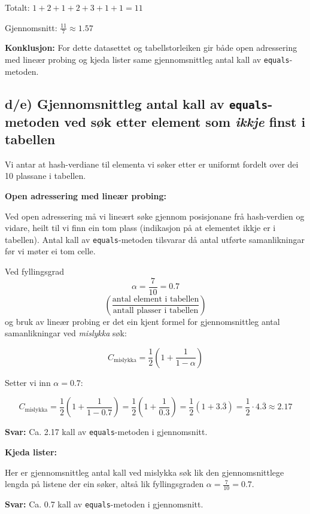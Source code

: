 \documentclass[12pt]{article}
\begin{document}
\noindent 
Totalt: $1 + 2 + 1 + 2 + 3 + 1 + 1 = 11$

\noindent
Gjennomsnitt: $\frac{11}{7} \approx 1.57$

\noindent
\textbf{Konklusjon:} For dette datasettet og tabellstorleiken gir både 
open adressering med lineær probing og kjeda lister same gjennomsnittleg 
antal kall av \texttt{equals}-metoden.

\subsection*{d/e) Gjennomsnittleg antal kall av \texttt{equals}-metoden ved søk etter element som \emph{ikkje} finst i tabellen}

\noindent 
Vi antar at hash-verdiane til elementa vi søker etter er uniformt fordelt 
over dei 10 plassane i tabellen.

\noindent 
\textbf{Open adressering med lineær probing:}

\noindent 
Ved open adressering må vi lineært søke gjennom posisjonane frå hash-verdien og vidare, 
heilt til vi finn ein tom plass (indikasjon på at elementet ikkje er i tabellen). 
Antal kall av \texttt{equals}-metoden tilsvarar då antal utførte samanlikningar før 
vi møter ei tom celle.

\noindent 
Ved fyllingsgrad 
\[
    \alpha = \frac{7}{10} = 0.7
\]
\[
    \left(\frac{\text{antal element i tabellen}}{\text{antall plasser i tabellen}}\right) 
\]
og bruk av lineær probing er det 
ein kjent formel for gjennomsnittleg antal samanlikningar ved \emph{mislykka} søk:

\[
C_{\text{mislykka}} = \frac{1}{2} \left( 1 + \frac{1}{1 - \alpha} \right)
\]

\noindent 
Setter vi inn $\alpha = 0.7$:

\[
C_{\text{mislykka}} = \frac{1}{2} \left( 1 + \frac{1}{1 - 0.7} \right) = 
\frac{1}{2} \left( 1 + \frac{1}{0.3} \right) = \frac{1}{2} (1 + 3.\overline{3}) = 
\frac{1}{2} \cdot 4.\overline{3} \approx 2.17
\]

\noindent 
\textbf{Svar:} Ca. 2.17 kall av \texttt{equals}-metoden i gjennomsnitt.

\noindent 
\textbf{Kjeda lister:}

\noindent 
Her er gjennomsnittleg antal kall ved mislykka søk lik den gjennomsnittlege lengda 
på listene der ein søker, altså lik fyllingsgraden $\alpha = \frac{7}{10} = 0.7$.

\noindent 
\textbf{Svar:} Ca. 0.7 kall av \texttt{equals}-metoden i gjennomsnitt.
\end{document}
